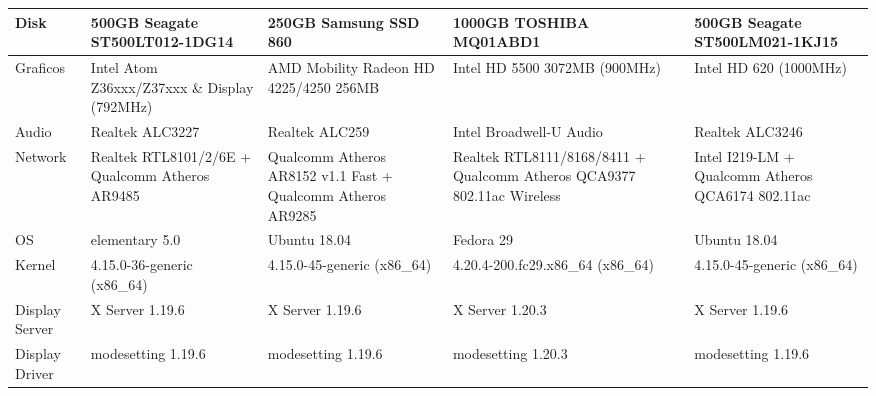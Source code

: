 \documentclass{article}
\begin{document}
\begin{table}
\begin{tabularx}{\linewidth}{|L|L|L|L|L|}
Disk                   & 500GB Seagate ST500LT012-1DG14                         & 250GB Samsung SSD 860                                       & 1000GB TOSHIBA MQ01ABD1                                                & 500GB Seagate ST500LM021-1KJ15                           \\ \hline
{}Graficos               & Intel Atom Z36xxx/Z37xxx \& Display (792MHz)           & AMD Mobility Radeon HD 4225/4250 256MB                      & Intel HD 5500 3072MB (900MHz)                                          & Intel HD 620 (1000MHz)                                   \\ \hline
{}Audio                  & Realtek ALC3227                                        & Realtek ALC259                                              & Intel Broadwell-U Audio                                                & Realtek ALC3246                                          \\ \hline
{}Network                & Realtek RTL8101/2/6E + Qualcomm Atheros AR9485         & Qualcomm Atheros AR8152 v1.1 Fast + Qualcomm Atheros AR9285 & Realtek RTL8111/8168/8411 + Qualcomm Atheros QCA9377 802.11ac Wireless & Intel I219-LM + Qualcomm Atheros QCA6174 802.11ac        \\ \hline
{}OS                     & elementary 5.0                                         & Ubuntu 18.04                                                & Fedora 29                                                              & Ubuntu 18.04                                             \\ \hline
{}Kernel                 & 4.15.0-36-generic (x86\_64)                            & 4.15.0-45-generic (x86\_64)                                 & 4.20.4-200.fc29.x86\_64 (x86\_64)                                      & 4.15.0-45-generic (x86\_64)                              \\ \hline
{}Display Server         & X Server 1.19.6                                        & X Server 1.19.6                                             & X Server 1.20.3                                                        & X Server 1.19.6                                          \\ \hline
{}Display Driver         & modesetting 1.19.6                                     & modesetting 1.19.6                                          & modesetting 1.20.3                                                     & modesetting 1.19.6                                       \\ \hline

\end{tabularx}
\end{table}
\end{document}
